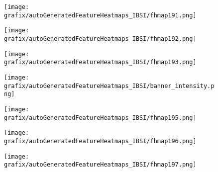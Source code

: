 \hspace{\hsp} 
\begin{subfigure}{\wid\textwidth} 
    \centering 
    \caption{\tiny \sffamily {}} 
    \vspace{\vsp} 
    \texttt{[image: grafix/autoGeneratedFeatureHeatmaps\_IBSI/fhmap191.png]} 
\end{subfigure} 
\hspace{\hsp} 
\begin{subfigure}{\wid\textwidth} 
    \centering 
    \caption{\tiny \sffamily {}} 
    \vspace{\vsp} 
    \texttt{[image: grafix/autoGeneratedFeatureHeatmaps\_IBSI/fhmap192.png]} 
\end{subfigure} 
\hspace{\hsp} 
\begin{subfigure}{\wid\textwidth} 
    \centering 
    \caption{\tiny \sffamily {}} 
    \vspace{\vsp} 
    \texttt{[image: grafix/autoGeneratedFeatureHeatmaps\_IBSI/fhmap193.png]} 
\end{subfigure} 
\hspace{\hsp} 
\begin{subfigure}{\wid\textwidth} 
    \texttt{[image: grafix/autoGeneratedFeatureHeatmaps\_IBSI/banner\_intensity.png]} 
\end{subfigure} 
\hspace{\hsp} 
\begin{subfigure}{\wid\textwidth} 
    \centering 
    \caption{\tiny \sffamily {}} 
    \vspace{\vsp} 
    \texttt{[image: grafix/autoGeneratedFeatureHeatmaps\_IBSI/fhmap195.png]} 
\end{subfigure} 
\hspace{\hsp} 
\begin{subfigure}{\wid\textwidth} 
    \centering 
    \caption{\tiny \sffamily {}} 
    \vspace{\vsp} 
    \texttt{[image: grafix/autoGeneratedFeatureHeatmaps\_IBSI/fhmap196.png]} 
\end{subfigure} 
\hspace{\hsp} 
\begin{subfigure}{\wid\textwidth} 
    \centering 
    \caption{\tiny \sffamily {}} 
    \vspace{\vsp} 
    \texttt{[image: grafix/autoGeneratedFeatureHeatmaps\_IBSI/fhmap197.png]} 
\end{subfigure} 
